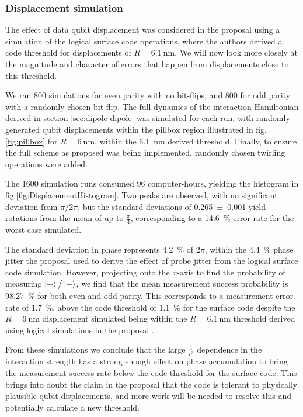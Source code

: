
\subsubsection{Displacement simulation}\label{sec:DisplacementSimulation}
The effect of data qubit displacement was considered in the proposal \cite{OGorman2016} using a simulation of the logical surface code operations, where the authors derived a code threshold for displacements of $R=\SI{6.1}{\nano\metre}$. We will now look more closely at the magnitude and character of errors that happen from displacements close to this threshold. 

We ran 800 simulations for even parity with no bit-flips, and 800 for odd parity with a randomly chosen bit-flip. The full dynamics of the interaction Hamiltonian derived in section \ref{sec:dipole-dipole} was simulated for each run, with randomly generated qubit displacements within the pillbox region illustrated in fig.\@ \ref{fig:pillbox} for $R = \SI{6}{\nano\metre}$, within the \SI{6.1}{\nano\metre} derived threshold. Finally, to ensure the full scheme as proposed was being implemented, randomly chosen twirling operations were added.

The 1600 simulation runs consumed 96 computer-hours, yielding the histogram in fig.\@ \ref{fig:DisplacementHistogram}. Two peaks are observed, with no significant deviation from $\pi$/$2\pi$, but the standard deviations of \num{0.265+-0.001} yield rotations from the mean of up to $\tfrac{\pi}{4}$, corresponding to a \SI{14.6}{\percent} error rate for the worst case simulated.

The standard deviation in phase represents \SI{4.2}{\percent} of $2\pi$, within the \SI{4.4}{\percent} phase jitter the proposal \cite{OGorman2016} used to derive the effect of probe jitter from the logical surface code simulation. However, projecting onto the $x$-axis to find the probability of measuring $\ket{+}\big/\ket{-}$, we find that the mean measurement success probability is \SI{98.27}{\percent} for both even and odd parity. This corresponds to a measurement error rate of \SI{1.7}{\percent}, above the code threshold of \SI{1.1}{\percent} for the surface code \cite{Wang2011,Fowler2012} despite the $R = \SI{6}{\nano\metre}$ displacement simulated being within the $R=\SI{6.1}{\nano\metre}$ threshold derived using logical simulations in the proposal \cite{OGorman2016}. 

From these simulations we conclude that the large $\tfrac{1}{r^3}$ dependence in the interaction strength has a strong enough effect on phase accumulation to bring the measurement success rate below the code threshold for the surface code. This brings into doubt the claim in the proposal \cite{OGorman2016} that the code is tolerant to physically plausible qubit displacements, and more work will be needed to resolve this and potentially calculate a new threshold.

